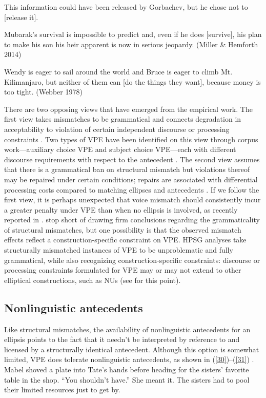 \documentclass[output=paper
                ,modfonts
                ,nonflat
	        ,collection
	        ,collectionchapter
	        ,collectiontoclongg
 	        ,biblatex
                ,babelshorthands
                ,newtxmath
                ,draftmode
                ,colorlinks, citecolor=brown
]{./langsci/langscibook}
\begin{document}
{\ea This information could have been released by Gorbachev, but he chose not to [release it]. \citep[37]{Hardt1993} \label{27}\z

\ea Mubarak's survival is impossible to predict and, even if he does [survive], his plan to make his son his heir apparent is now in serious jeopardy. (Miller \& Hemforth 2014) \label{28}\z

\ea Wendy is eager to sail around the world and Bruce is eager to climb Mt. Kilimanjaro, but neither of them can [do the things they want], because money is too tight. (Webber 1978) \label{29}\z

There are two opposing views that have emerged from the empirical work. The first view takes mismatches to be grammatical and connects degradation in acceptability to violation of certain independent discourse \citep{Kehler2002, Miller2011, Kertz2013, Miller2014a, Miller2014b} or processing constraints \citep{Kim2011}. Two types of VPE have been identified on this view through corpus work---auxiliary choice VPE and subject choice VPE---each with different discourse requirements with respect to the antecedent \citep{Miller2011, Miller2014a, Miller2014b}. The second view assumes that there is a grammatical ban on structural mismatch but violations thereof may be repaired under certain conditions; repairs are associated with differential processing costs compared to matching ellipses and antecedents \citep{Arregui2006, Grant2012}. If we follow the first view, it is perhaps unexpected that voice mismatch should consistently incur a greater penalty under VPE than when no ellipsis is involved, as recently reported in \citet{Kim2017}. \citet{Kim2017} stop short of drawing firm conclusions regarding the grammaticality of structural mismatches, but one possibility is that the observed mismatch effects reflect a construction-specific constraint on VPE. HPSG analyses take structurally mismatched instances of VPE to be unproblematic and fully grammatical, while also recognizing construction-specific constraints: discourse or processing constraints formulated for VPE may or may not extend to other elliptical constructions, such as NUs (see \citealt{Ginzburg2018} for this point).


\subsection{Nonlinguistic antecedents}
Like structural mismatches, the availability of nonlinguistic antecedents for an ellipsis points to the fact that it needn't be interpreted by reference to and licensed by a structurally identical antecedent. Although this option is somewhat limited, VPE does tolerate nonlinguistic antecedents, as shown in (\ref{30})--(\ref{31}) \citep[see also][]{Hankamer1976, Schachter1977}.
\ea Mabel shoved a plate into Tate's hands before heading for the sisters' favorite table in the shop. ``You shouldn't have.'' She meant it. The sisters had to pool their limited resources
just to get by. \citep[ex. 23][]{Miller2014b}\label{30}\z

}
\end{document}
